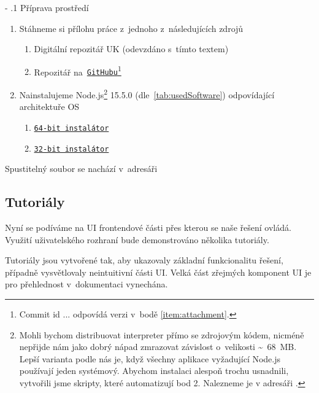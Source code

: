 \documentclass[12pt, a4paper, twoside]{article}
\makeatletter
\renewcommand\paragraph{%
	\@startsection{subparagraph}{5}{0mm}%
	{-\baselineskip}%
	{.1\baselineskip}%
	{\normalfont\normalsize\bfseries}}
\makeatother
\begin{document}
	\paragraph{Příprava prostředí}
	\begin{enumerate}[leftmargin=*, align=left]
		\item Stáhneme si přílohu práce z~jednoho z~následujících zdrojů
		\begin{enumerate}[leftmargin=*,label={\alph*)}, align=left,topsep=0pt]
			\item \label{item:attachment} Digitální repozitář UK (odevzdáno s~tímto textem)
			\item Repozitář na~\href{https://github.com/jakublevy/puppeteer-automation}{\nolinkurl{GitHubu}}\footnote{Commit id ... odpovídá verzi v~bodě \ref{item:attachment}.} 
		\end{enumerate}
		\item Nainstalujeme Node.js\footnote{Mohli bychom distribuovat interpreter přímo se zdrojovým kódem, nicméně nepřijde nám jako dobrý nápad zmrazovat závislost o~velikosti \textasciitilde~68~MB. Lepší varianta podle nás je, když všechny aplikace vyžadující Node.js používají jeden systémový. Abychom instalaci alespoň trochu usnadnili, vytvořili jsme skripty, které automatizují bod 2. Nalezneme je v adresáři .} 15.5.0 (dle~\cref{tab:usedSoftware}) odpovídající architektuře OS
		\begin{enumerate}[leftmargin=*,label={\alph*)}, align=left,topsep=0pt]
			\item \href{https://nodejs.org/download/release/v15.5.0/node-v15.5.0-x64.msi}{\texttt{64-bit instalátor}}
			\item \href{https://nodejs.org/download/release/v15.5.0/node-v15.5.0-x86.msi}{\texttt{32-bit instalátor}}
		\end{enumerate}
	\end{enumerate}
	Spustitelný soubor se nachází v~adresáři 
	\subsection{Tutoriály}
	\label{sub_sec:usersDocs}
	Nyní se podíváme na UI frontendové části přes kterou se naše řešení ovládá. Využití uživatelského rozhraní bude demonstrováno několika tutoriály.
	
	Tutoriály jsou vytvořené tak, aby ukazovaly základní funkcionalitu řešení, případně vysvětlovaly neintuitivní části UI. Velká část zřejmých komponent UI je pro přehlednost v~dokumentaci vynechána.
\end{document}
